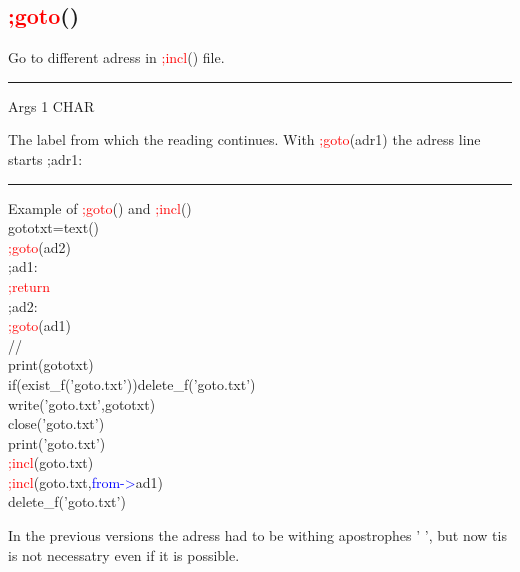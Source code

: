 \subsection{\textcolor{Red}{;goto}()}
\label{inpugoto}
Go to different adress in \textcolor{Red}{;incl}() file.
\vspace{0.3cm}
\hrule
\vspace{0.3cm}
\noindent Args \tabto{3cm} 1 \tabto{5cm}  CHAR \tabto{7cm}
\begin{changemargin}{3cm}{0cm}
\noindent  The label from which the reading continues. With \textcolor{Red}{;goto}(adr1)
the adress line starts ;adr1:
\end {changemargin}
\hrule
\vspace{0.2cm}
\begin{example}[inpugotoex]Example of \textcolor{Red}{;goto}() and \textcolor{Red}{;incl}()\\
\label{inpugotoex}
gototxt=\textcolor{VioletRed}{text}()\\
\textcolor{Red}{;goto}(ad2)\\
;ad1:\\
\textcolor{Red}{;return}\\
;ad2:\\
\textcolor{Red}{;goto}(ad1)\\
//\\
\textcolor{VioletRed}{print}(gototxt)\\
\textcolor{VioletRed}{if}(\textcolor{VioletRed}{exist\_f}('goto.txt'))\textcolor{VioletRed}{delete\_f}('goto.txt')\\
\textcolor{VioletRed}{write}('goto.txt',gototxt)\\
\textcolor{VioletRed}{close}('goto.txt')\\
\textcolor{VioletRed}{print}('goto.txt')\\
\textcolor{Red}{;incl}(goto.txt)\\
\textcolor{Red}{;incl}(goto.txt,\textcolor{blue}{from->}ad1)\\
\textcolor{VioletRed}{delete\_f}('goto.txt')
\end{example}
\begin{note}
In the previous versions the adress had to be withing apostrophes ' ', but now tis is not necessatry
even if it is possible.
\end{note}
